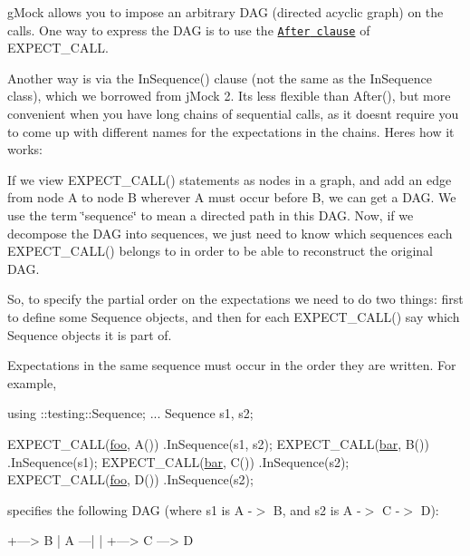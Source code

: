 g\+Mock allows you to impose an arbitrary D\+AG (directed acyclic graph) on the calls. One way to express the D\+AG is to use the \href{reference/mocking.md#EXPECT_CALL.After}{\tt {\ttfamily After} clause} of {\ttfamily E\+X\+P\+E\+C\+T\+\_\+\+C\+A\+LL}.

Another way is via the {\ttfamily In\+Sequence()} clause (not the same as the {\ttfamily In\+Sequence} class), which we borrowed from j\+Mock 2. It\textquotesingle{}s less flexible than {\ttfamily After()}, but more convenient when you have long chains of sequential calls, as it doesn\textquotesingle{}t require you to come up with different names for the expectations in the chains. Here\textquotesingle{}s how it works\+:

If we view {\ttfamily E\+X\+P\+E\+C\+T\+\_\+\+C\+A\+L\+L()} statements as nodes in a graph, and add an edge from node A to node B wherever A must occur before B, we can get a D\+AG. We use the term \char`\"{}sequence\char`\"{} to mean a directed path in this D\+AG. Now, if we decompose the D\+AG into sequences, we just need to know which sequences each {\ttfamily E\+X\+P\+E\+C\+T\+\_\+\+C\+A\+L\+L()} belongs to in order to be able to reconstruct the original D\+AG.

So, to specify the partial order on the expectations we need to do two things\+: first to define some {\ttfamily Sequence} objects, and then for each {\ttfamily E\+X\+P\+E\+C\+T\+\_\+\+C\+A\+L\+L()} say which {\ttfamily Sequence} objects it is part of.

Expectations in the same sequence must occur in the order they are written. For example,


\begin{DoxyCode}
using ::testing::Sequence;
...
  Sequence s1, s2;

  EXPECT\_CALL(\mbox{\hyperlink{namespacefoo}{foo}}, A())
      .InSequence(s1, s2);
  EXPECT\_CALL(\mbox{\hyperlink{namespacebar}{bar}}, B())
      .InSequence(s1);
  EXPECT\_CALL(\mbox{\hyperlink{namespacebar}{bar}}, C())
      .InSequence(s2);
  EXPECT\_CALL(\mbox{\hyperlink{namespacefoo}{foo}}, D())
      .InSequence(s2);
\end{DoxyCode}


specifies the following D\+AG (where {\ttfamily s1} is {\ttfamily A -\/$>$ B}, and {\ttfamily s2} is {\ttfamily A -\/$>$ C -\/$>$ D})\+:


\begin{DoxyCode}
     +---> B
     |
A ---|
     |
     +---> C ---> D
\end{DoxyCode}


